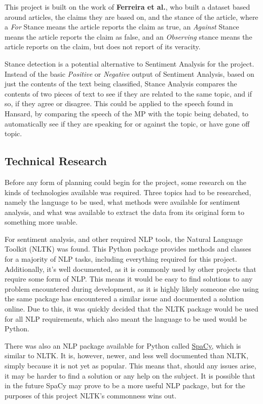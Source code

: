 This project is built on the work of \textbf{Ferreira et al.}\cite{Ferreira2016}, who built a dataset based around articles, the claims they are based on, and the stance of the article, where a \emph{For} Stance means the article reports the claim as true, an \emph{Against} Stance means the article reports the claim as false, and an \emph{Observing} stance means the article reports on the claim, but does not report of its veracity.

Stance detection is a potential alternative to Sentiment Analysis for the project. Instead of the basic \emph{Positive} or \emph{Negative} output of Sentiment Analysis, based on just the contents of the text being classified, Stance Analysis compares the contents of two pieces of text to see if they are related to the same topic, and if so, if they agree or disagree. This could be applied to the speech found in Hansard, by comparing the speech of the MP with the topic being debated, to automatically see if they are speaking for or against the topic, or have gone off topic.

\subsection{Technical Research}
\label{sec:bck_tech_research}

Before any form of planning could begin for the project, some research on the kinds of technologies available was required. Three topics had to be researched, namely the language to be used, what methods were available for sentiment analysis, and what was available to extract the data from its original form to something more usable.

For sentiment analysis, and other required NLP tools, the Natural Language Toolkit (NLTK)\cite{Bird2009} was found. This Python package provides methods and classes for a majority of NLP tasks, including everything required for this project. Additionally, it’s well documented, as it is commonly used by other projects that require some form of NLP. This means it would be easy to find solutions to any problem encountered during development, as it is highly likely someone else using the same package has encountered a similar issue and documented a solution online. Due to this, it was quickly decided that the NLTK package would be used for all NLP requirements, which also meant the language to be used would be Python.

There was also an NLP package available for Python called \href{spacy.io}{SpaCy}, which is similar to NLTK. It is, however, newer, and less well documented than NLTK, simply because it is not yet as popular. This means that, should any issues arise, it may be harder to find a solution or any help on the subject. It is possible that in the future SpaCy may prove to be a more useful NLP package, but for the purposes of this project NLTK's commonness wins out.

